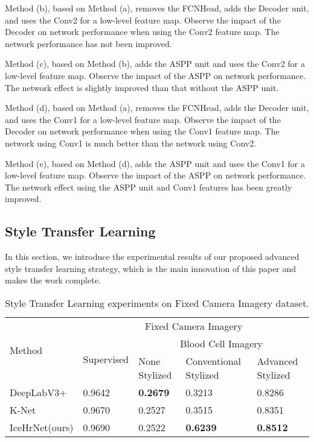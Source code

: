 \documentclass[a4paper,fleqn]{cas-dc}
\begin{document}
Method (b), based on Method (a), removes the FCNHead, adds the Decoder unit, and uses the Conv2 for a low-level feature map. Observe the impact of the Decoder on network performance when using the Conv2 feature map. The network performance has not been improved.

Method (c), based on Method (b), adds the ASPP unit and uses the Conv2 for a low-level feature map. Observe the impact of the ASPP on network performance. The network effect is slightly improved than that without the ASPP unit.

Method (d), based on Method (a), removes the FCNHead, adds the Decoder unit, and uses the Conv1 for a low-level feature map. Observe the impact of the Decoder on network performance when using the Conv1 feature map. The network using Conv1 is much better than the network using Conv2.

Method (e), based on Method (d), adds the ASPP unit and uses the Conv1 for a low-level feature map. Observe the impact of the ASPP on network performance. The network effect using the ASPP unit and Conv1 features has been greatly improved.

\subsection{Style Transfer Learning}

In this section, we introduce the experimental results of our proposed advanced style transfer learning strategy, which is the main innovation of this paper and makes the work complete.
\begin{table*}[htbp]
	\centering
	\caption{Style Transfer Learning experiments on Fixed Camera Imagery dataset.}\label{tbl6}
	\begin{tabular*}{\tblwidth}{*{2}{p{24mm}<{\centering}}*{3}{p{34.7mm}<{\centering}}}
		\toprule
		\multirow{3}{*}{Method} & \multicolumn{4}{c}{Fixed Camera Imagery} \\
		\cline{2-5}
		& \multirow{2}{*}{Supervised} & \multicolumn{3}{c}{Blood Cell Imagery} \\
		\cline{3-5}
		&  & None Stylized & Conventional Stylized & Advanced Stylized \\
		\midrule
		DeepLabV3+ & 0.9642 & \textbf{0.2679} & 0.3213 & 0.8286 \\
		K-Net & 0.9670 & 0.2527 & 0.3515 & 0.8351 \\
		IceHrNet(ours) & 0.9690 & 0.2522 & \textbf{0.6239} & \textbf{0.8512} \\
		\bottomrule
	\end{tabular*}
\end{table*}
\end{document}
